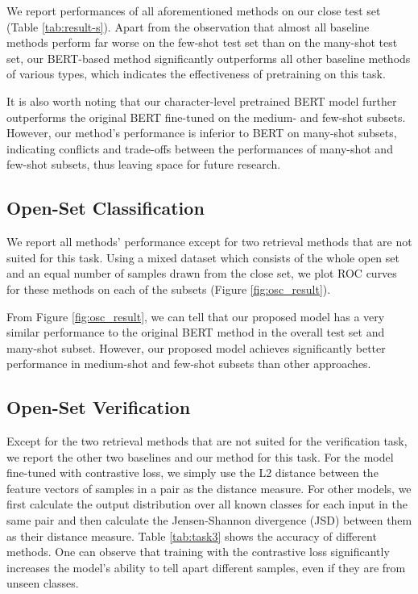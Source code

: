 \documentclass{article}
\begin{document}
We report performances of all aforementioned methods on our close test set (Table \ref{tab:result-s}). 
Apart from the observation that almost all baseline methods perform far worse on the few-shot test set than on the many-shot test set, our BERT-based method significantly outperforms all other baseline methods of various types, which indicates the effectiveness of pretraining on this task.

It is also worth noting that our character-level pretrained BERT model further outperforms the original BERT fine-tuned on the medium- and few-shot subsets. However, our method's performance is inferior to BERT on many-shot subsets, indicating conflicts and trade-offs between the performances of many-shot and few-shot subsets, thus leaving space for future research.

\subsection{Open-Set Classification}
We report all methods' performance except for two retrieval methods that are not suited for this task. Using a mixed dataset which consists of the whole open set and an equal number of samples drawn from the close set, we plot ROC curves for these methods on each of the subsets (Figure \ref{fig:osc_result}).

From Figure \ref{fig:osc_result}, we can tell that our proposed model has a very similar performance to the original BERT method in the overall test set and many-shot subset. However, our proposed model achieves significantly better performance in medium-shot and few-shot subsets than other approaches. 

\subsection{Open-Set Verification}
Except for the two retrieval methods that are not suited for the verification task, we report the other two baselines and our method for this task. For the model fine-tuned with contrastive loss, we simply use the L2 distance between the feature vectors of samples in a pair as the distance measure. For other models, we first calculate the output distribution over all known classes for each input in the same pair and then calculate the Jensen-Shannon divergence (JSD) between them as their distance measure. 
Table \ref{tab:task3} shows the accuracy of different methods. One can observe that training with the contrastive loss significantly increases the model's ability to tell apart different samples, even if they are from unseen classes. 
\end{document}
